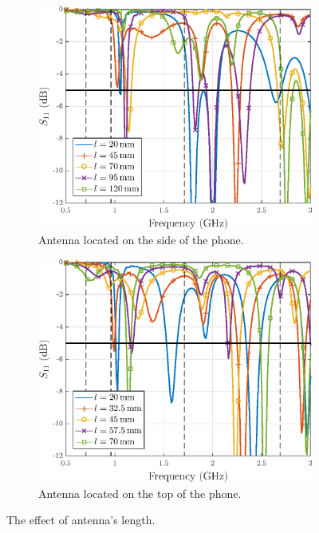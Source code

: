 \begin{figure}[H]
    \centering
    \begin{subfigure}[b]{0.49\textwidth}
        \includegraphics[width=\textwidth]{img/ant_length_long_res.eps}
        \caption{Antenna located on the side of the phone.}
        \label{fig:ant_length_long_res}
    \end{subfigure}
    \begin{subfigure}[b]{0.49\textwidth}
        \includegraphics[width=\textwidth]{img/ant_length_short_res.eps}
        \caption{Antenna located on the top of the phone.}
        \label{fig:ant_length_short_res}
    \end{subfigure}
    \caption{The effect of antenna's length.}
    \label{fig:ant_length_result}
\end{figure}

